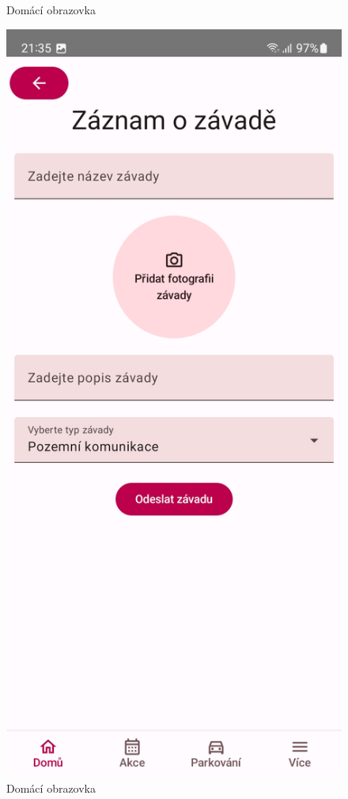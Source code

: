 \begin{figure}[H]
    \caption{Domácí obrazovka}
  \endminipage\hfill
    \includegraphics[width=\linewidth]{screens/1b.jpg}
    \caption{Domácí obrazovka}
  \endminipage\hfill
\end{figure}

